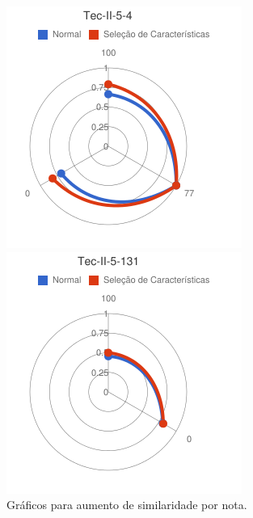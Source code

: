 \begin{figure}
\begin{minipage}{.3\textwidth}
\end{minipage}%
\begin{minipage}{.3\textwidth}
  \centering
  \includegraphics[width=\linewidth]{img/red-ufes-moodle/image11.png}
\end{minipage} %
\begin{minipage}{.3\textwidth}
  \centering
  \includegraphics[width=\linewidth]{img/red-ufes-moodle/image12.png}
\end{minipage}
\caption{Gráficos para aumento de similaridade por nota.}
\end{figure}

